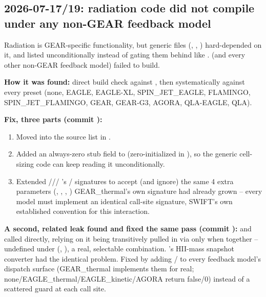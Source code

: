 \subsection{2026-07-17/19: radiation code did not compile under any
non-GEAR feedback model}
\label{sec:t7-buildfix}

Radiation is GEAR-specific functionality, but generic files
(, ,
) hard-depended on it, and
 listed 
unconditionally instead of gating them behind 
like .  (and every other non-GEAR feedback model) failed
to build.

\textbf{How it was found:} direct build check against
, then systematically
against every  preset (none, EAGLE, EAGLE-XL,
SPIN\_JET\_EAGLE, FLAMINGO, SPIN\_JET\_FLAMINGO, GEAR, GEAR-G3, AGORA,
QLA-EAGLE, QLA).

\textbf{Fix, three parts (commit ):}
\begin{enumerate}
\item Moved  into the
   source list in .
\item Added an always-zero  stub field to
   (zero-initialized in
  ), so the generic cell-sizing code can
  keep reading it unconditionally.
\item Extended ///
  's /
   signatures to accept (and ignore) the same 4 extra
  parameters (, , ,
  ) GEAR\_thermal's own signature had already grown --
  every model must implement an identical call-site signature, SWIFT's
  own established convention for this interaction.
\end{enumerate}

\textbf{A second, related leak found and fixed the same pass (commit
):}  and
 called
 directly, relying on
it being transitively pulled in via  only when
 together -- undefined under
 (,
), a real, selectable combination.
's HII-mass snapshot converter had the
identical problem. Fixed by adding
/
 to every feedback model's
dispatch surface (GEAR\_thermal implements them for real;
none/EAGLE\_thermal/EAGLE\_kinetic/AGORA return false/0) instead of a
scattered  guard at each call site.

